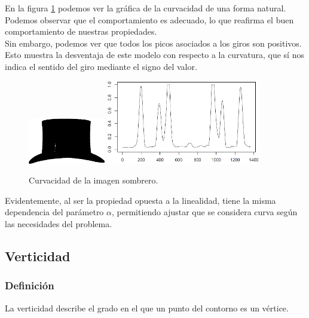 En la figura \ref{fig10} podemos ver la gráfica de la curvacidad de una forma natural. Podemos observar que el comportamiento es adecuado, lo que reafirma el buen comportamiento de nuestras propiedades.\\

Sin embargo, podemos ver que todos los picos asociados a los giros son positivos. Esto muestra la desventaja de este modelo con respecto a la curvatura, que sí nos indica el sentido del giro mediante el signo del valor.\\

\begin{figure}[H]
\begin{center}

\includegraphics[width=0.3\textwidth]{img/hat-7.png} \hfill \includegraphics[width=0.6\textwidth]{img/nolin-hat-7.png}
\end{center}

\caption{Curvacidad de la imagen sombrero.}
\label{fig10}
\end{figure}


Evidentemente, al ser la propiedad opuesta a la linealidad, tiene la misma dependencia del parámetro $\alpha$, permitiendo ajustar que se considera curva según las necesidades del problema.\\

\subsection{Verticidad}

\subsubsection{Definición}
La verticidad describe el grado en el que un punto del contorno es un vértice.\\


